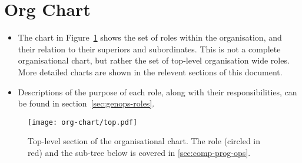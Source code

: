 \section{Org Chart}
\label{sec:org-chart}

\begin{itemize}
\item The chart in Figure~\ref{fig:org-chart-top} shows the set of roles within the organisation, and their relation to their superiors and subordinates. This is not a complete organisational chart, but rather the set of top-level organisation wide roles. More detailed charts are shown in the relevent sections of this document.

\item Descriptions of the purpose of each role, along with their responsibilities, can be found in section~\ref{sec:genops-roles}.

\end{itemize}

\begin{figure}[h]
  \begin{center}
    \texttt{[image: org-chart/top.pdf]}
  \end{center}
  \caption{\label{fig:org-chart-top}Top-level section of the organisational chart. The  role (circled in red) and the sub-tree below is covered in \autoref{sec:comp-prog-ops}.}
\end{figure}

